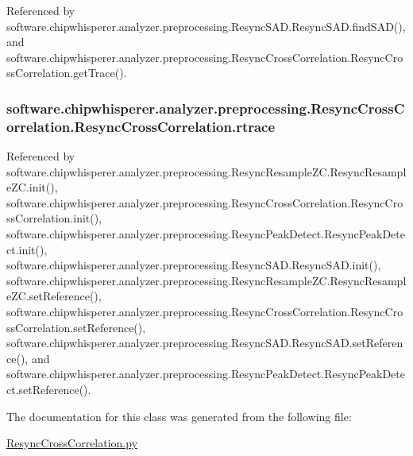 Referenced by software.\+chipwhisperer.\+analyzer.\+preprocessing.\+Resync\+S\+A\+D.\+Resync\+S\+A\+D.\+find\+S\+A\+D(), and software.\+chipwhisperer.\+analyzer.\+preprocessing.\+Resync\+Cross\+Correlation.\+Resync\+Cross\+Correlation.\+get\+Trace().

\hypertarget{classsoftware_1_1chipwhisperer_1_1analyzer_1_1preprocessing_1_1ResyncCrossCorrelation_1_1ResyncCrossCorrelation_ac3f40be30a03d875cfda9424a5e279e8}{}
\subsubsection[{rtrace}]{\setlength{\rightskip}{0pt plus 5cm}software.\+chipwhisperer.\+analyzer.\+preprocessing.\+Resync\+Cross\+Correlation.\+Resync\+Cross\+Correlation.\+rtrace}\label{classsoftware_1_1chipwhisperer_1_1analyzer_1_1preprocessing_1_1ResyncCrossCorrelation_1_1ResyncCrossCorrelation_ac3f40be30a03d875cfda9424a5e279e8}


Referenced by software.\+chipwhisperer.\+analyzer.\+preprocessing.\+Resync\+Resample\+Z\+C.\+Resync\+Resample\+Z\+C.\+init(), software.\+chipwhisperer.\+analyzer.\+preprocessing.\+Resync\+Cross\+Correlation.\+Resync\+Cross\+Correlation.\+init(), software.\+chipwhisperer.\+analyzer.\+preprocessing.\+Resync\+Peak\+Detect.\+Resync\+Peak\+Detect.\+init(), software.\+chipwhisperer.\+analyzer.\+preprocessing.\+Resync\+S\+A\+D.\+Resync\+S\+A\+D.\+init(), software.\+chipwhisperer.\+analyzer.\+preprocessing.\+Resync\+Resample\+Z\+C.\+Resync\+Resample\+Z\+C.\+set\+Reference(), software.\+chipwhisperer.\+analyzer.\+preprocessing.\+Resync\+Cross\+Correlation.\+Resync\+Cross\+Correlation.\+set\+Reference(), software.\+chipwhisperer.\+analyzer.\+preprocessing.\+Resync\+S\+A\+D.\+Resync\+S\+A\+D.\+set\+Reference(), and software.\+chipwhisperer.\+analyzer.\+preprocessing.\+Resync\+Peak\+Detect.\+Resync\+Peak\+Detect.\+set\+Reference().



The documentation for this class was generated from the following file\+:\begin{DoxyCompactItemize}
\item 
\hyperlink{ResyncCrossCorrelation_8py}{Resync\+Cross\+Correlation.\+py}\end{DoxyCompactItemize}
